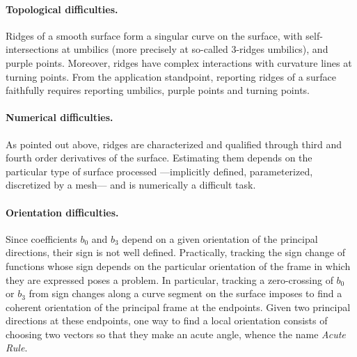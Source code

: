 \paragraph{Topological difficulties.}
Ridges of a smooth surface form a singular curve on the surface, with
self-intersections at umbilics (more precisely at so-called 3-ridges
umbilics), and purple points. Moreover, ridges have complex
interactions with curvature lines at turning points. From the
application standpoint, reporting ridges of a surface faithfully
requires reporting umbilics, purple points and turning points.

\paragraph{Numerical difficulties.}
As pointed out above, ridges are characterized and qualified through
third and fourth order derivatives of the surface.  Estimating them
depends on the particular type of surface processed ---implicitly
defined, parameterized, discretized by a mesh--- and is numerically a
difficult task.

\paragraph{Orientation difficulties.}
Since coefficients $b_0$ and $b_3$ depend on a given orientation of
the principal directions, their sign is not well defined.
Practically, tracking the sign change of functions whose sign depends
on the particular orientation of the frame in which they are expressed
poses a problem. In particular, tracking a zero-crossing of $b_0$ or
$b_3$ from sign changes along a curve segment on the surface imposes
to find a coherent orientation of the principal frame at the
endpoints. Given two principal directions at these endpoints, one way
to find a local orientation consists of choosing two vectors so that
they make an acute angle, whence the name {\em Acute Rule}.


